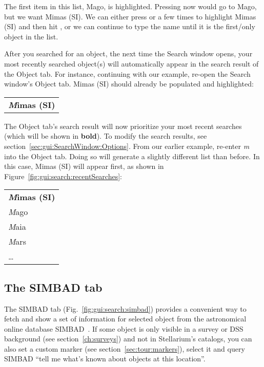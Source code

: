 \noindent The first item in this list, Mago, is
highlighted. Pressing \key{\return} now would go to Mago, but we want
Mimas (SI). We can either press \key{\tab} or \key{\arrowkeydown} a few times to highlight Mimas (SI)
and then hit \key{\return}, or we can continue to type the name until
it is the first/only object in the list.

After you searched for an object, the next time the Search window opens,
your most recently searched object(s)
will automatically appear in the search result of the Object tab.
For instance, continuing with our example, re-open the Search window's Object tab.
Mimas (SI) should already be populated and highlighted:
\begin{center}
\begin{tabular}{l}
        \textbf{\emph{M}imas (SI)}\\
\end{tabular}
\end{center}

\noindent The Object tab's search result will now prioritize your most recent searches
(which will be shown in \textbf{bold}).
To modify the search results, see section~\ref{sec:gui:SearchWindow:Options}.
From our earlier example, re-enter \emph{m} into the Object tab.
Doing so will generate a slightly different list than before.
In this case, Mimas (SI) will appear first, as shown in Figure~\ref{fig:gui:search:recentSearches}:
\begin{center}
\begin{tabular}{l}
        \textbf{\emph{M}imas (SI)}\\
        \emph{M}ago\\
        \emph{M}aia\\
        \emph{M}ars\\
        \ldots\\
\end{tabular}
\end{center}

\subsection{The SIMBAD tab}
\label{sec:gui:SearchWindow:SIMBAD}
The SIMBAD tab (Fig.~\ref{fig:gui:search:simbad}) provides a
convenient way to fetch and show a set of information for selected
object from the astronomical online database
SIMBAD~\citep{2000A&AS..143....9W}.  If some object is only visible in
a survey or DSS background (see section~\ref{ch:surveys}) and not in
Stellarium's catalogs, you can also set a custom marker (see
section~\ref{sec:tour:markers}), select it and query SIMBAD ``tell me
what's known about objects at this location''.

